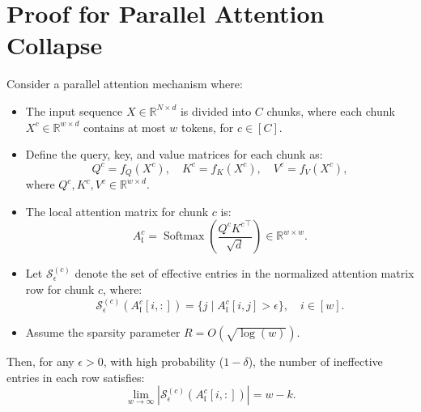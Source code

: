 \appendix
\onecolumn

\section{Proof for Parallel Attention Collapse}
\label{sec:parallel_attn_collapse_aa}
\begin{theorem}\label{thm:parallel_attn_collapse}
    Consider a parallel attention mechanism where:
    \begin{itemize}
        \item The input sequence \( X \in \mathbb{R}^{N \times d} \) is divided into \( C \) chunks, where each chunk \( X^{c} \in \mathbb{R}^{w \times d} \) contains at most \( w \) tokens, for \( c \in [C] \).
        \item Define the query, key, and value matrices for each chunk as:
        \[
        Q^{c} = f_Q(X^{c}), \quad K^{c} = f_K(X^{c}), \quad V^{c} = f_V(X^{c}),
        \]
        where \( Q^{c}, K^{c}, V^{c} \in \mathbb{R}^{w \times d} \).
        \item The local attention matrix for chunk \( c \) is:
        \[
        A^{c}_\mathfrak{l} = \operatorname{Softmax}\left(\frac{Q^{c} {K^{c}}^\top}{\sqrt{d}}\right) \in \mathbb{R}^{w \times w}.
        \]
        \item Let \( \mathcal{S}_\epsilon^{(c)} \) denote the set of effective entries in the normalized attention matrix row for chunk \( c \), where:
        \[
        \mathcal{S}_\epsilon^{(c)}(A^{c}_\mathfrak{l}[i,:]) = \{ j \mid A^{c}_\mathfrak{l}[i,j] > \epsilon \}, \quad i \in [w].
        \]
        \item Assume the sparsity parameter \( R = O(\sqrt{\log(w)}) \).
    \end{itemize}
    Then, for any \(\epsilon > 0\), with high probability (\(1 - \delta\)), the number of ineffective entries in each row satisfies:
    \[
    \lim_{w \to \infty} | \mathcal{S}_\epsilon^{(c)}(A^{c}_\mathfrak{l}[i,:]) | = w - k.
    \]
\end{theorem}

